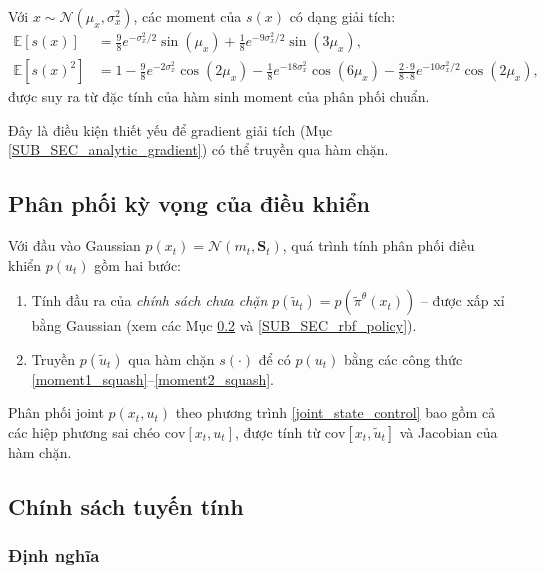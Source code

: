 Với $x \sim \mathcal{N}(\mu_x, \sigma^2_x)$, các moment của $s(x)$ có dạng giải tích:
\begin{align}
    \mathbb{E}[s(x)] &= \frac{9}{8} e^{-\sigma_x^2/2}\sin(\mu_x) + \frac{1}{8} e^{-9\sigma_x^2/2}\sin(3\mu_x),
    \label{moment1_squash} \\
    \mathbb{E}[s(x)^2] &= 1 - \frac{9}{8} e^{-2\sigma_x^2}\cos(2\mu_x) - \frac{1}{8} e^{-18\sigma_x^2}\cos(6\mu_x) - \frac{2 \cdot 9}{8 \cdot 8} e^{-10\sigma_x^2/2}\cos(2\mu_x),
    \label{moment2_squash}
\end{align}
được suy ra từ đặc tính của hàm sinh moment của phân phối chuẩn.

Đây là điều kiện thiết yếu để gradient giải tích (Mục \ref{SUB_SEC_analytic_gradient}) có thể truyền qua hàm chặn.

\subsection{Phân phối kỳ vọng của điều khiển}
\label{SUB_SEC_control_distribution}

Với đầu vào Gaussian $p(x_t) = \mathcal{N}(m_t, \mathbf{S}_t)$, quá trình tính phân phối điều khiển $p(u_t)$ gồm hai bước:
\begin{enumerate}
    \item Tính đầu ra của \textit{chính sách chưa chặn} $p(\tilde{u}_t) = p(\tilde{\pi}^\theta(x_t))$ -- được xấp xỉ bằng Gaussian (xem các Mục \ref{SUB_SEC_linear_policy} và \ref{SUB_SEC_rbf_policy}).
    \item Truyền $p(\tilde{u}_t)$ qua hàm chặn $s(\cdot)$ để có $p(u_t)$ bằng các công thức \eqref{moment1_squash}--\eqref{moment2_squash}.
\end{enumerate}

Phân phối joint $p(x_t, u_t)$ theo phương trình \eqref{joint_state_control} bao gồm cả các hiệp phương sai chéo $\mathrm{cov}[x_t, u_t]$, được tính từ $\mathrm{cov}[x_t, \tilde{u}_t]$ và Jacobian của hàm chặn.

\subsection{Chính sách tuyến tính}
\label{SUB_SEC_linear_policy}

\subsubsection{Định nghĩa}
\label{SUB_SUB_SEC_linear_def}

